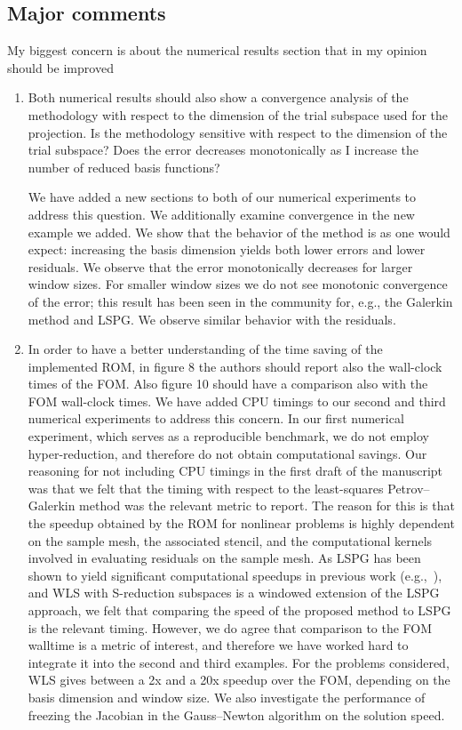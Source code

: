 \documentclass[3p,computermodern,10pt]{elsarticle}
\begin{document}
\subsection{Major comments}
My biggest concern is about the numerical results section that in my opinion should be improved
\begin{enumerate}
\item Both numerical results should also show a convergence analysis of the methodology with respect to the dimension of the trial subspace used for the projection. Is the methodology sensitive with respect to the dimension of the trial subspace? Does the error decreases monotonically as I increase the number of reduced basis functions?

{\color{red} We have added a new sections to both of our numerical experiments to address this question. We additionally examine convergence in the new example we added. We show that the behavior of the method is as one would expect: increasing the basis dimension yields both lower errors and lower residuals. We observe that the error monotonically decreases for larger window sizes. For smaller window sizes we do not see monotonic convergence of the error; this result has been seen in the community for, e.g., the Galerkin method and LSPG. We observe similar behavior with the residuals.} 

\item In order to have a better understanding of the time saving of the implemented ROM, in figure 8 the authors should report also the wall-clock times of the FOM. Also figure 10 should have a comparison also with the FOM wall-clock times.
{\color{red} We have added CPU timings to our second and third numerical experiments to address this concern. In our first numerical experiment, which serves as a reproducible benchmark, we do not employ hyper-reduction, and therefore do not obtain computational savings. Our reasoning for not including CPU timings in the first draft of the manuscript was that we felt that the timing with respect to the least-squares Petrov--Galerkin method was the relevant metric to report. The reason for this is that the speedup obtained by the ROM for nonlinear problems is highly dependent on the sample mesh, the associated stencil, and the computational kernels involved in evaluating residuals on the sample mesh. As LSPG has been shown to yield significant computational speedups in previous work (e.g.,~\cite{carlberg_lspg_v_galerkin}), and WLS with S-reduction subspaces is a windowed extension of the LSPG approach, we felt that comparing the speed of the proposed method to LSPG is the relevant timing. However, we do agree that comparison to the FOM walltime is a metric of interest, and therefore we have worked hard to integrate it into the second and third examples. For the problems considered, WLS gives between a 2x and a 20x speedup over the FOM, depending on the basis dimension and window size. We also investigate the performance of freezing the Jacobian in the Gauss--Newton algorithm on the solution speed.}


\end{enumerate}
\end{document}
